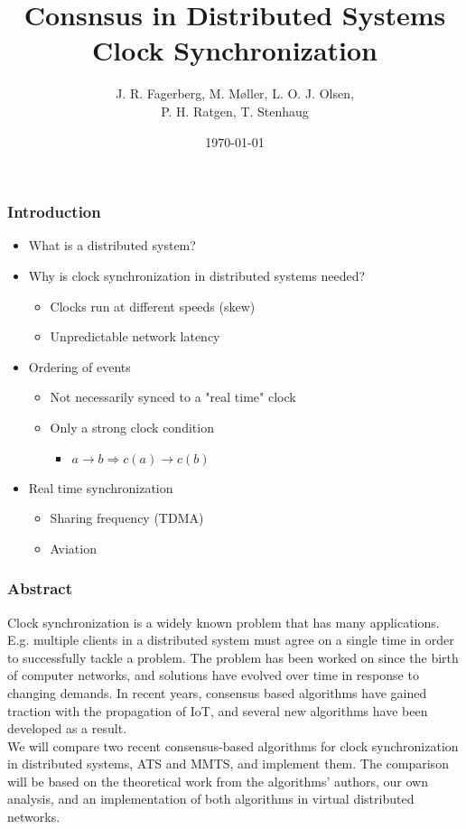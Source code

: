 \documentclass{beamer}
\title{Consnsus in Distributed Systems \\ Clock Synchronization}
\author{J. R. Fagerberg, M. Møller, L. O. J. Olsen,\\ P. H. Ratgen, T. Stenhaug}
\institute{IMADA}
\date{\today}
\begin{document}
 
\frame{\titlepage}
 
\begin{frame}
\frametitle{Introduction}
    \begin{itemize}
        \item What is a distributed system?
        \item Why is clock synchronization in distributed systems needed?
        \begin{itemize}
            \item Clocks run at different speeds (skew)
            \item Unpredictable network latency
        \end{itemize}
        \item Ordering of events
        \begin{itemize}
            \item Not necessarily synced to a "real time" clock
            \item Only a strong clock condition
        \begin{itemize}
            \item \( a \rightarrow b \Rightarrow c(a) \rightarrow c(b) \)
        \end{itemize}
    \end{itemize}
    \item Real time synchronization
    \begin{itemize}
        \item Sharing frequency (TDMA)
        \item Aviation
    \end{itemize}
    \end{itemize}
\end{frame}
 
\begin{frame}
\frametitle{Abstract}
Clock synchronization is a widely known problem that has many applications. E.g. multiple clients in a distributed system must agree on a single time in order to successfully tackle a problem. The problem has been worked on since the birth of computer networks, and solutions have evolved over time in response to changing demands. In recent years, consensus based algorithms have gained traction with the propagation of IoT, and several new algorithms have been developed as a result.\\
\vspace{1em}
We will compare two recent consensus-based algorithms for clock synchronization in distributed systems, ATS and MMTS, and implement them. The comparison will be based on the theoretical work from the algorithms' authors, our own analysis, and an implementation of both algorithms in virtual distributed networks.
\end{frame}
\end{document}
